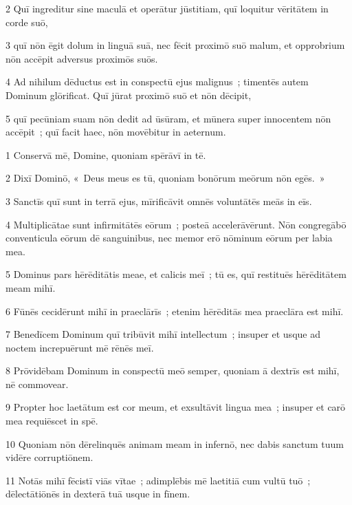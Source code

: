 \psalmVerse
  {\phantom{00}2}
  {Quī ingreditur sine maculā et operātur jūstitiam, quī loquitur vēritātem in corde suō,}


\psalmVerse
  {\phantom{00}3}
  {quī nōn ēgit dolum in linguā suā, nec fēcit proximō suō malum, et opprobrium nōn accēpit adversus proximōs suōs.}


\psalmVerse
  {\phantom{00}4}
  {Ad nihilum dēductus est in conspectū ejus malignus~; timentēs autem Dominum glōrificat. Quī jūrat proximō suō et nōn dēcipit,}


\psalmVerse
  {\phantom{00}5}
  {quī pecūniam suam nōn dedit ad ūsūram, et mūnera super innocentem nōn accēpit~; quī facit haec, nōn movēbitur in aeternum.}



\psalmVerse
  {\phantom{00}1}
  {Conservā mē, Domine, quoniam spērāvī in tē.}


\psalmVerse
  {\phantom{00}2}
  {Dixī Dominō, «~Deus meus es tū, quoniam bonōrum meōrum nōn egēs.~»}


\psalmVerse
  {\phantom{00}3}
  {Sanctīs quī sunt in terrā ejus, mīrificāvit omnēs voluntātēs meās in eīs.}


\psalmVerse
  {\phantom{00}4}
  {Multiplicātae sunt infirmitātēs eōrum~; posteā accelerāvērunt. Nōn congregābō conventicula eōrum dē sanguinibus, nec memor erō nōminum eōrum per labia mea.}


\psalmVerse
  {\phantom{00}5}
  {Dominus pars hērēditātis meae, et calicis meī~; tū es, quī restituēs hērēditātem meam mihī.}


\psalmVerse
  {\phantom{00}6}
  {Fūnēs cecidērunt mihī in praeclārīs~; etenim hērēditās mea praeclāra est mihī.}


\psalmVerse
  {\phantom{00}7}
  {Benedīcem Dominum quī tribūvit mihī intellectum~; insuper et usque ad noctem increpuērunt mē rēnēs meī.}


\psalmVerse
  {\phantom{00}8}
  {Prōvidēbam Dominum in conspectū meō semper, quoniam ā dextrīs est mihī, nē commovear.}


\psalmVerse
  {\phantom{00}9}
  {Propter hoc laetātum est cor meum, et exsultāvit lingua mea~; insuper et carō mea requiēscet in spē.}


\psalmVerse
  {\phantom{0}10}
  {Quoniam nōn dērelinquēs animam meam in infernō, nec dabis sanctum tuum vidēre corruptiōnem.}


\psalmVerse
  {\phantom{0}11}
  {Notās mihī fēcistī viās vītae~; adimplēbis mē laetitiā cum vultū tuō~; dēlectātiōnēs in dexterā tuā usque in fīnem.}


